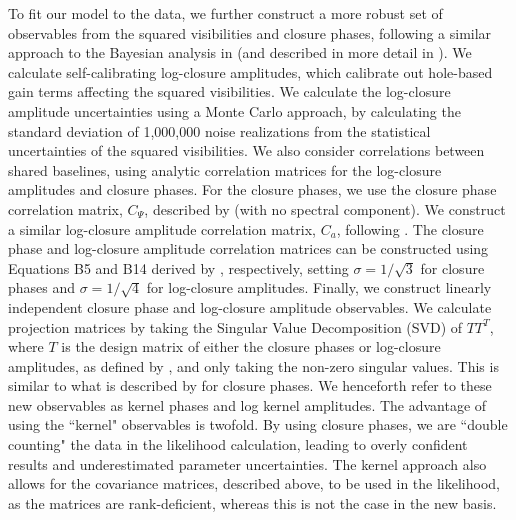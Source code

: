 \documentclass[11pt,twocolumn,twocolappendix]{aastex631}
\begin{document}
{To fit our model to the data, we further construct a more robust set of observables from the squared visibilities and closure phases, following a similar approach to the Bayesian analysis in \cite{Xuan2024} (and described in more detail in \cite{GL229B_methods}). We calculate self-calibrating log-closure amplitudes, which calibrate out hole-based gain terms affecting the squared visibilities. We calculate the log-closure amplitude uncertainties using a Monte Carlo approach, by calculating the standard deviation of 1,000,000 noise realizations from the statistical uncertainties of the squared visibilities. %
We also consider correlations between shared baselines, using analytic correlation matrices for the log-closure amplitudes and closure phases. For the closure phases, we use the closure phase correlation matrix, $C_{\Psi}$, described by \cite{2020A&A...644A.110K} (with no spectral component). We construct a similar log-closure amplitude correlation matrix, $C_{a}$, following \cite{2020ApJ...894...31B}. The closure phase and log-closure amplitude correlation matrices can be constructed using Equations B5 and B14 derived by \cite{2020ApJ...894...31B}, respectively, setting $\sigma = 1/\sqrt{3}$ for closure phases and $\sigma = 1/\sqrt{4}$ for log-closure amplitudes. Finally, we construct linearly independent closure phase and log-closure amplitude observables. We calculate projection matrices by taking the Singular Value Decomposition (SVD) of $T T^T$, where $T$ is the design matrix of either the closure phases or log-closure amplitudes, as defined by \cite{2020ApJ...894...31B}, and only taking the non-zero singular values. This is similar to what is described by  \cite{2013MNRAS.433.1718I} for closure phases. We henceforth refer to these new observables as kernel phases and log kernel amplitudes. The advantage of using the ``kernel" observables is twofold. By using closure phases, we are ``double counting" the data in the likelihood calculation, leading to overly confident results and underestimated parameter uncertainties. The kernel approach also allows for the covariance matrices, described above, to be used in the likelihood, as the matrices are rank-deficient, whereas this is not the case in the new basis.}
\end{document}
